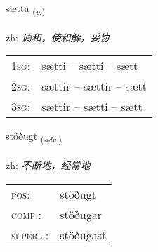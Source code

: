 \documentclass[frontgrid, backgrid]{flacards}\usepackage[]{graphicx}\usepackage[]{color}
\begin{document}
\renewcommand{\flhead}{\vskip5pt \fboxsep=0pt {\small\bfseries\footnotesize Sagnorð | 动词}}
\renewcommand{\fcfoot}{\vskip5pt \fboxsep=0pt \hspace{2pt}{\small\bfseries\footnotesize 2K}}

\renewcommand{\blhead}{\vskip5pt {\small\bfseries\footnotesize Sagnorð | 动词 }}
\renewcommand{\bcfoot}{\vskip5pt \hspace{2pt}{\small\bfseries\footnotesize 2K}}


{sætta \small{\textsubscript{(\textit{v.})}} \\[1ex] %
\textphonetic{[saihta]} \\
zh: \emph{调和，使和解，妥协} \\  [2ex]
\renewcommand*{\arraystretch}{0.8}
\begin{tabular}{p{1cm}l}
\textsc{1sg}: & sætti -- sætti -- sætt \\ 
\textsc{2sg}: & sættir -- sættir -- sætt \\ 
\textsc{3sg}: & sættir -- sætti -- sætt \\ 
\end{tabular}
}

\renewcommand{\flhead}{\vskip5pt \fboxsep=0pt {\small\bfseries\footnotesize Atviksorð | 副词}}
\renewcommand{\fcfoot}{\vskip5pt \fboxsep=0pt \hspace{2pt}{\small\bfseries\footnotesize 2K}}

\renewcommand{\blhead}{\vskip5pt {\small\bfseries\footnotesize Atviksorð | 副词 }}
\renewcommand{\bcfoot}{\vskip5pt \hspace{2pt}{\small\bfseries\footnotesize 2K}}


{stöðugt \small{\textsubscript{(\textit{adv.})}} \\[1ex] %
\textphonetic{[stœːðʏxt]} \\
zh: \emph{不断地，经常地} \\  [2ex]
\renewcommand*{\arraystretch}{0.8}
\begin{tabular}{ll}
\textsc{pos}: & stöðugt \\ 
\textsc{comp.}: & stöðugar \\ 
\textsc{superl.}: & stöðugast \\
\end{tabular}
}
\end{document}
